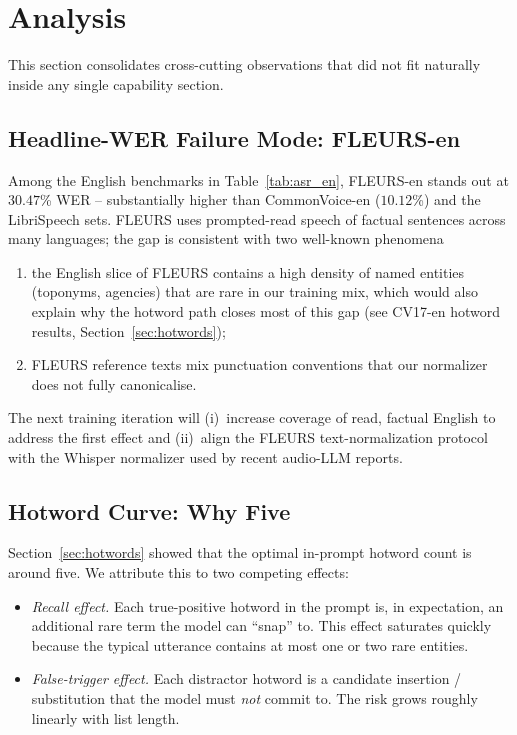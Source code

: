 \section{Analysis}
\label{sec:analysis}

This section consolidates cross-cutting observations that did not fit
naturally inside any single capability section.

\subsection{Headline-WER Failure Mode: FLEURS-en}

Among the English benchmarks in Table~\ref{tab:asr_en}, FLEURS-en
stands out at $30.47$\% WER -- substantially higher than CommonVoice-en
($10.12$\%) and the LibriSpeech sets. FLEURS uses prompted-read speech
of factual sentences across many languages; the gap is consistent with
two well-known phenomena
\begin{enumerate}
  \item the English slice of FLEURS contains a high density of named
        entities (toponyms, agencies) that are rare in our training
        mix, which would also explain why the hotword path closes most
        of this gap (see CV17-en hotword results,
        Section~\ref{sec:hotwords});
  \item FLEURS reference texts mix punctuation conventions that our
        normalizer does not fully canonicalise.
\end{enumerate}
The next training iteration will (i)~increase coverage of read,
factual English to address the first effect and (ii)~align the FLEURS
text-normalization protocol with the Whisper normalizer used by recent
audio-LLM reports.

\subsection{Hotword Curve: Why Five}
\label{subsec:why-five}

Section~\ref{sec:hotwords} showed that the optimal in-prompt hotword
count is around five. We attribute this to two competing effects:

\begin{itemize}
  \item \emph{Recall effect.} Each true-positive hotword in the prompt
        is, in expectation, an additional rare term the model can
        ``snap'' to. This effect saturates quickly because the typical
        utterance contains at most one or two rare entities.
  \item \emph{False-trigger effect.} Each distractor hotword is a
        candidate insertion / substitution that the model must
        \emph{not} commit to. The risk grows roughly linearly with
        list length.
\end{itemize}

